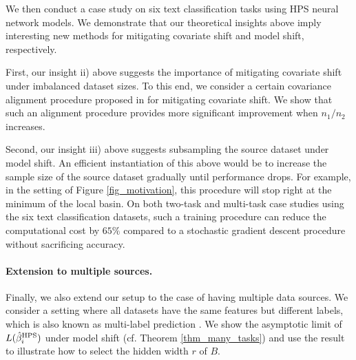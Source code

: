 We then conduct a case study on six text classification tasks using HPS neural network models.
We demonstrate that our theoretical insights above imply interesting new methods for mitigating covariate shift and model shift, respectively.

First, our insight ii) above suggests the importance of mitigating covariate shift under imbalanced dataset sizes.
To this end, we consider a certain covariance alignment procedure proposed in \citet{WZR20} for mitigating covariate shift.
We show that such an alignment procedure provides more significant improvement when $n_1 / n_2$ increases.

Second, our insight iii) above suggests subsampling the source dataset under model shift.
An efficient instantiation of this above would be to increase the sample size of the source dataset gradually until performance drops.
For example, in the setting of Figure \ref{fig_motivation}, this procedure will stop right at the minimum of the local basin.
On both two-task and multi-task case studies using the six text classification datasets, such a training procedure can reduce the computational cost by $65\%$ compared to a stochastic gradient descent procedure without sacrificing accuracy.


\paragraph{Extension to multiple sources.}
Finally, we also extend our setup to the case of having multiple data sources.
We consider a setting where all datasets have the same features but different labels, which is also known as multi-label prediction \cite{hsu2009multi}.
We show the asymptotic limit of $L(\hat{\beta}_i^{\textup{HPS}})$ under model shift (cf. Theorem \ref{thm_many_tasks}) and use the result to illustrate how to select the hidden width $r$ of $B$.

